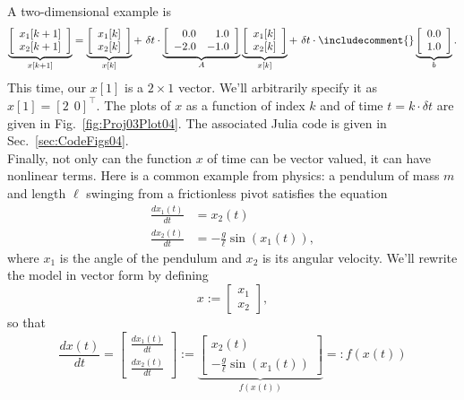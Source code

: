 A two-dimensional example is
\begin{equation}
    \label{eq:DiscreteEquation03}
    \underbrace{\left[\begin{array}{c}
x_1[k+1] \\ x_2[k+1]  \end{array}\right]}_{x[k+1]}=\underbrace{\left[\begin{array}{c}
x_1[k] \\ x_2[k]  \end{array}\right]}_{x[k]} + ~ \delta t \cdot \underbrace{\left[\begin{array}{rr}
0.0 & 1.0 \\
-2.0 & -1.0
 \end{array}\right]}_{A} \underbrace{\left[\begin{array}{c}
x_1[k] \\ x_2[k]  \end{array}\right]}_{x[k]}  +  ~\delta t \cdot \includecomment{}\underbrace{\left[\begin{array}{r}
0.0  \\1.0  \end{array}\right]}_{b}.
\end{equation}
This time, our $x[1]$ is a $2 \times 1$ vector. We'll arbitrarily specify it as $x[1]=[2~~0]^\top$. The plots of $x$ as a function of index $k$ and of time $t=k\cdot \delta t$ are given in Fig.~\ref{fig:Proj03Plot04}. The associated Julia code is given in Sec.~\ref{sec:CodeFigs04}.\\


Finally, not only can the function $x$ of time can be vector valued, it can have nonlinear terms. Here is a common example from physics: a pendulum of mass $m$ and length $\ell$ swinging from a frictionless pivot satisfies the equation
\begin{equation}
\label{eq:PendulumODE01}
\begin{aligned}
    \frac{d x_1(t)}{dt}&= x_2(t) \\
    \frac{d x_2(t)}{dt}&= -\frac{g}{\ell} \sin(x_1(t)),
\end{aligned}
\end{equation}
where $x_1$ is the angle of the pendulum and $x_2$ is its angular velocity. 
We'll rewrite the model in vector form by defining
\begin{equation}
    \label{eq:Statex}
    x := \left[\begin{array}{c}
        x_1 \\
         x_2
    \end{array} \right],
\end{equation}
so that
\begin{equation}
    \label{eq:Statex02}
    \frac{dx(t)}{dt} = \left[\begin{array}{c}
        \frac{dx_1(t)}{dt}  \\
         \frac{dx_2(t)}{dt} 
    \end{array} \right]:=  \underbrace{\left[\begin{array}{c}
        x_2(t) \\
          -\frac{g}{\ell} \sin(x_1(t))
    \end{array} \right]}_{f(x(t))} =: f(x(t))
\end{equation}

